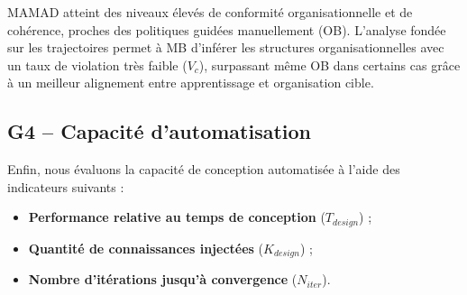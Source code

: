 MAMAD atteint des niveaux élevés de conformité organisationnelle et de cohérence, proches des politiques guidées manuellement (OB). L'analyse fondée sur les trajectoires permet à MB d'inférer les structures organisationnelles avec un taux de violation très faible ($V_c$), surpassant même OB dans certains cas grâce à un meilleur alignement entre apprentissage et organisation cible.

\subsection{G4 – Capacité d'automatisation}

Enfin, nous évaluons la capacité de conception automatisée à l'aide des indicateurs suivants :

\begin{itemize}
    \item \textbf{Performance relative au temps de conception} ($T_{design}$) ;
    \item \textbf{Quantité de connaissances injectées} ($K_{design}$) ;
    \item \textbf{Nombre d'itérations jusqu'à convergence} ($N_{iter}$).
\end{itemize}

